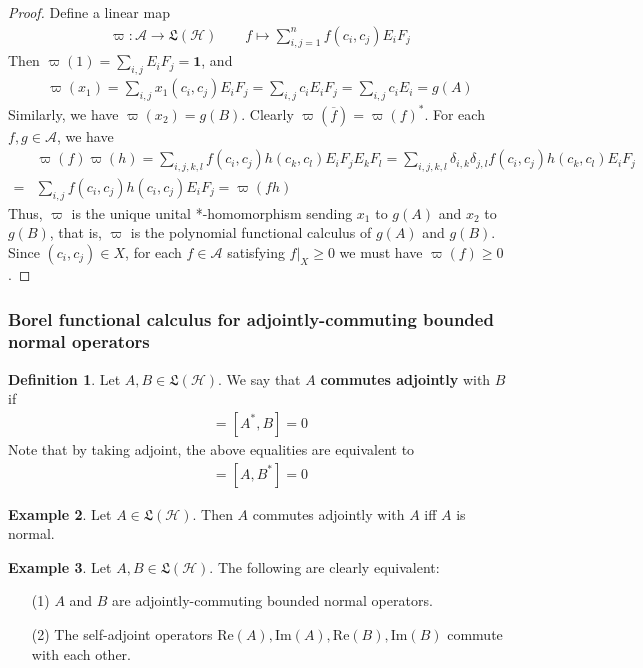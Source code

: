\documentclass[12pt,b5paper,notitlepage]{article}
\theoremstyle{definition}
\newtheorem{df}{Definition}[subsection]
\newtheorem{eg}[df]{Example}
\theoremstyle{plain}
\newcommand{\fk}{\mathfrak}
\newcommand{\ovl}{\overline}
\newcommand{\idt}{\mathbf{1}}
\newcommand{\scr}{\mathscr}
\newcommand{\Real}{\mathrm{Re}}
\newcommand{\Imag}{\mathrm{Im}}
\newcommand{\MH}{\mathcal H}
\numberwithin{equation}{section}
\begin{document}
\begin{proof}
Define a linear map
\begin{align*}
\varpi:\scr A\rightarrow\fk L(\MH)\qquad f\mapsto \sum_{i,j=1}^n f(c_i,c_j)E_iF_j
\end{align*}
Then $\varpi(1)=\sum_{i,j}E_iF_j=\idt$, and
\begin{align*}
\varpi(x_1)=\sum_{i,j}x_1(c_i,c_j)E_iF_j=\sum_{i,j}c_iE_iF_j=\sum_{i,j}c_iE_i=g(A)
\end{align*}
Similarly, we have $\varpi(x_2)=g(B)$. Clearly $\varpi(\ovl f)=\varpi(f)^*$. For each $f,g\in\scr A$, we have
\begin{align*}
&\varpi(f)\varpi(h)=\sum_{i,j,k,l}f(c_i,c_j)h(c_k,c_l)E_iF_jE_kF_l=\sum_{i,j,k,l}\delta_{i,k}\delta_{j,l}f(c_i,c_j)h(c_k,c_l)E_iF_j\\
=&\sum_{i,j}f(c_i,c_j)h(c_i,c_j)E_iF_j=\varpi(fh)
\end{align*}
Thus, $\varpi$ is the unique unital *-homomorphism sending $x_1$ to $g(A)$ and $x_2$ to $g(B)$, that is, $\varpi$ is the polynomial functional calculus of $g(A)$ and $g(B)$. Since $(c_i,c_j)\in X$, for each $f\in\scr A$ satisfying $f|_X\geq0$ we must have $\varpi(f)\geq0$.
\end{proof}


\subsubsection{Borel functional calculus for adjointly-commuting bounded normal operators}


\begin{df}
Let $A,B\in\fk L(\MH)$. We say that $A$ \textbf{commutes adjointly} with $B$   if
\begin{align*}
[A,B]=[A^*,B]=0
\end{align*}
Note that by taking adjoint, the above equalities are equivalent to
\begin{align*}
[A^*,B^*]=[A,B^*]=0
\end{align*}
\end{df}

\begin{eg}
Let $A\in\fk L(\MH)$. Then $A$ commutes adjointly with $A$ iff $A$ is normal.
\end{eg}

\begin{eg}
Let $A,B\in\fk L(\MH)$. The following are clearly equivalent:
\begin{enumerate}
\item[(1)] $A$ and $B$ are adjointly-commuting bounded normal operators.
\item[(2)] The self-adjoint operators $\Real(A),\Imag(A),\Real(B),\Imag(B)$ commute with each other.
\end{enumerate}
\end{eg}
\end{document}
